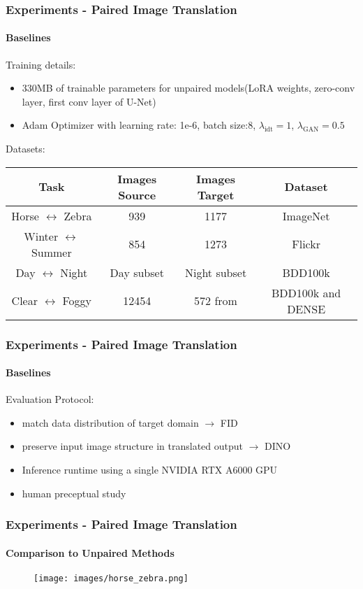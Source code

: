 \begin{frame}
\frametitle{Experiments - Paired Image Translation}
\framesubtitle{Baselines}
Training details:
\begin{itemize}
    \item 330MB of trainable parameters for unpaired models(LoRA weights, zero-conv layer, first conv layer of U-Net)
    \item Adam Optimizer with learning rate: 1e-6, batch size:8, $\lambda _{\text{idt}} = 1$, $\lambda _{\text{GAN}} = 0.5$
\end{itemize}
Datasets:
\begin{table}
    \centering
    \begin{tabular}{|c|c|c|c|}
        Task & Images Source & Images Target & Dataset \\
        \hline
        Horse $\leftrightarrow$ Zebra & 939 & 1177 & ImageNet \cite{5206848}\\
        Winter $\leftrightarrow$ Summer & 854 & 1273 & Flickr \cite{zhu2020unpaired} \\
        Day $\leftrightarrow$ Night & Day subset & Night subset & BDD100k \cite{yu2020bdd100k}\\
        Clear $\leftrightarrow$ Foggy & 12454 & 572 from & BDD100k and DENSE \cite{bijelic2020seeing}
    \end{tabular}       
\end{table}
\end{frame}

\begin{frame}
    \frametitle{Experiments - Paired Image Translation}
    \framesubtitle{Baselines}
    Evaluation Protocol:
    \begin{itemize}
        \item match data distribution of target domain $\rightarrow$ FID \cite{heusel2018gans}
        \item preserve input image structure in translated output $\rightarrow$ DINO \cite{tumanyan2022splicing}
        \item Inference runtime using a single NVIDIA RTX A6000 GPU
        \item human preceptual study
    \end{itemize}
    
    
\end{frame}

\begin{frame}
    \frametitle{Experiments - Paired Image Translation}
    \framesubtitle{Comparison to Unpaired Methods}
    \begin{figure}
        \centering
        \texttt{[image: images/horse\_zebra.png]}
        
    \end{figure}
\end{frame}


